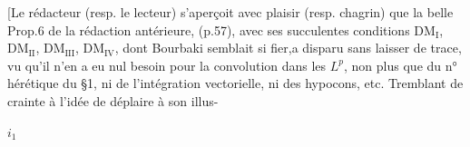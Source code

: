 [Le rédacteur (resp. le lecteur) s'aperçoit avec plaisir (resp. chagrin) que la belle Prop.6 de la rédaction antérieure, (p.57), avec ses succulentes conditions $\mathrm{DM}_{\mathrm I}$, $\mathrm{DM}_{\mathrm {II}}$, $\mathrm{DM}_{\mathrm {III}}$, $\mathrm{DM}_{\mathrm {IV}}$, dont Bourbaki semblait si fier,a disparu sans laisser de trace, vu qu'il n'en a eu nul besoin pour la convolution dans les $L^p$, non plus que du n° hérétique du §1, ni de l'intégration vectorielle, ni des hypocons, etc. Tremblant de crainte à l'idée de déplaire à son illus-

$i_1$


